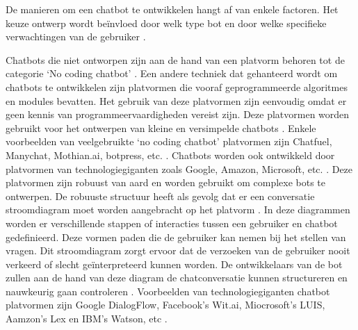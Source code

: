 De manieren om een chatbot te ontwikkelen hangt af van enkele factoren. Het keuze ontwerp wordt beïnvloed door welk type bot en door welke specifieke verwachtingen van de gebruiker \autocite{Rahman2017}.

Chatbots die niet ontworpen zijn aan de hand van een platvorm behoren tot de categorie ‘No coding chatbot’ \autocite{Tamrakar2021}. Een andere techniek dat gehanteerd wordt om chatbots te ontwikkelen zijn platvormen die vooraf geprogrammeerde algoritmes en modules bevatten. Het gebruik van deze platvormen zijn eenvoudig omdat er geen kennis van programmeervaardigheden vereist zijn. Deze platvormen worden gebruikt voor het ontwerpen van kleine en versimpelde chatbots  \autocite{Rahman2017}. Enkele voorbeelden van veelgebruikte ‘no coding chatbot’ platvormen zijn Chatfuel, Manychat, Mothian.ai, botpress, etc.  \autocite{Rahman2017}. 
Chatbots worden ook ontwikkeld door platvormen van technologiegiganten zoals Google, Amazon, Microsoft, etc. \autocite{Gkikas2021}. Deze platvormen zijn robuust van aard en worden gebruikt om complexe bots te ontwerpen. De robuuste structuur heeft als gevolg dat er een conversatie stroomdiagram moet worden aangebracht op het platvorm \autocite{Tamrakar2021}. In deze diagrammen worden er verschillende stappen of interacties tussen een gebruiker en chatbot gedefinieerd. Deze vormen paden die de gebruiker kan nemen bij het stellen van vragen. Dit stroomdiagram zorgt ervoor dat de verzoeken van de gebruiker nooit verkeerd of slecht geïnterpreteerd kunnen worden.  De ontwikkelaars van de bot zullen aan de hand van deze diagram de chatconversatie kunnen structureren en nauwkeurig gaan controleren \autocite{CotyM.CollinsColumbus2019}. Voorbeelden van technologiegiganten chatbot platvormen zijn Google DialogFlow, Facebook’s Wit.ai, Miocrosoft’s LUIS, Aamzon’s Lex en IBM’s Watson, etc \autocite{Tamrakar2021}.





